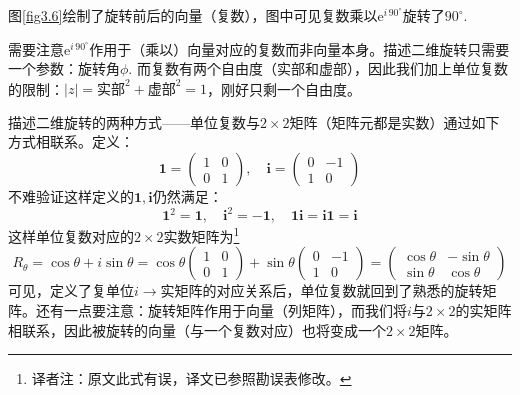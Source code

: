 图\ref{fig3.6}绘制了旋转前后的向量（复数），图中可见复数乘以$\mathrm{e}^{i\, 90^\circ}$旋转了$90^\circ$.

需要注意$\mathrm{e}^{i\, 90^\circ}$作用于（乘以）向量对应的复数而非向量本身。描述二维旋转只需要一个参数：旋转角$\phi$. 而复数有两个自由度（实部和虚部），因此我们加上单位复数的限制：$|z| = \text{实部}^2 + \text{虚部}^2 = 1$，刚好只剩一个自由度。

描述二维旋转的两种方式——单位复数与$2 \times 2$矩阵（矩阵元都是实数）通过如下方式相联系。定义：
\begin{equation}
\label{equ3.15}
\mathbf{1} =
	\begin{pmatrix}
		1 & 0 \\ 0 & 1
	\end{pmatrix}
,\quad
\mathbf{i} =
	\begin{pmatrix}
		0 & -1 \\ 1 & 0
	\end{pmatrix}
\end{equation}
不难验证这样定义的$\mathbf{1, i}$仍然满足：
\begin{equation}
\mathbf{1}^2 = \mathbf{1},\quad \mathbf{i}^2 = -\mathbf{1},\quad \mathbf{1i} = \mathbf{i1} = \mathbf{i}
\end{equation}
这样单位复数对应的$2 \times 2$实数矩阵为\footnote{译者注：原文此式有误，译文已参照勘误表修改。}
\begin{equation}
\label{equ3.17}
R_\theta = \cos \theta + i\sin\theta = \cos \theta
\begin{pmatrix}
	1 & 0 \\ 0 & 1
\end{pmatrix}
+ \sin \theta
\begin{pmatrix}
	0 & -1 \\ 1 & 0
\end{pmatrix}
=
\begin{pmatrix}
	\cos \theta & -\sin \theta \\
	\sin \theta & \cos \theta
\end{pmatrix}
\end{equation}
可见，定义了复单位$i \rightarrow \text{实矩阵}$的对应关系后，单位复数就回到了熟悉的旋转矩阵。还有一点要注意：旋转矩阵作用于向量（列矩阵），而我们将$i$与$2 \times 2$的实矩阵相联系，因此被旋转的向量（与一个复数对应）也将变成一个$2 \times 2$矩阵。

